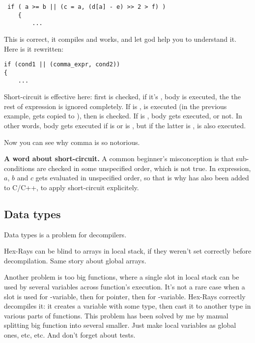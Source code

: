 \begin{lstlisting}
 if ( a >= b || (c = a, (d[a] - e) >> 2 > f) )
    {
    	...
\end{lstlisting}

This is correct, it compiles and works, and let god help you to understand it.
Here is it rewritten:

\begin{lstlisting}
if (cond1 || (comma_expr, cond2))
{
	...
\end{lstlisting}

Short-circuit is effective here: first  is checked, if it's ,  body is executed, the the rest
of  expression is ignored completely.
If  is ,  is executed (in the previous example,  gets copied to ),
then  is checked.
If  is ,  body gets executed, or not.
In other words,  body gets executed if  is  or  is ,
but if the latter is ,  is also executed.

Now you can see why comma is so notorious.

\textbf{A word about short-circuit.}
A common beginner's misconception is that sub-conditions are checked in some unspecified order, which is not true.
In  expression, $a$, $b$ and $c$ gets evaluated in unspecified order, so that is why \TT{||} has also been
added to C/C++, to apply short-circuit explicitely.

\subsection{Data types}

Data types is a problem for decompilers.

Hex-Rays can be blind to arrays in local stack, if they weren't set correctly before decompilation.
Same story about global arrays.

Another problem is too big functions, where a single slot in local stack can be used by several variables
across function's execution.
It's not a rare case when a slot is used for -variable, then for pointer, then for -variable.
Hex-Rays correctly decompiles it: it creates a variable with some type, then cast it to another type in various
parts of functions.
This problem has been solved by me by manual splitting big function into several smaller.
Just make local variables as global ones, etc, etc.
And don't forget about tests.

